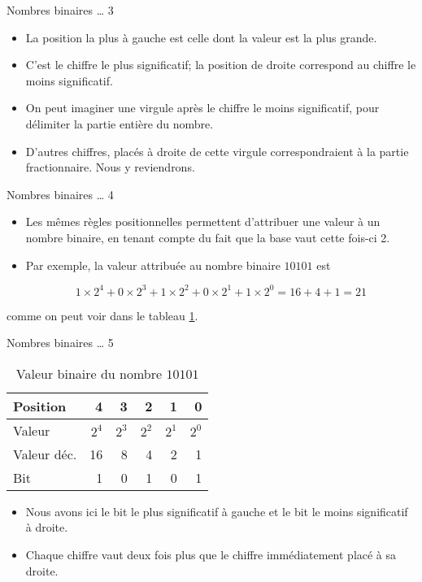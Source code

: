 \documentclass[presentation]{beamer}
\begin{document}
\begin{frame}[label={sec:org017026a}]{Nombres binaires \ldots{} 3}
\begin{itemize}
\item La position la plus à gauche est celle dont la valeur est la plus grande.

\item C'est le \alert{chiffre le plus significatif}; la position de droite correspond au \alert{chiffre le moins significatif}.

\item On peut imaginer une virgule après le chiffre le moins significatif, pour délimiter la partie entière du nombre.

\item D'autres chiffres, placés à droite de cette virgule correspondraient à la partie fractionnaire.  Nous y reviendrons.
\end{itemize}
\end{frame}

\begin{frame}[label={sec:orgdb9f49f}]{Nombres binaires \ldots{} 4}
\begin{itemize}
\item Les mêmes règles positionnelles permettent d'attribuer une valeur à un nombre binaire, en tenant compte du fait que la base vaut cette fois-ci 2.

\item Par exemple, la valeur attribuée au nombre binaire \(10101\) est

$$ 1 \times 2^4 + 0 \times 2^3 + 1 \times 2^2 + 0 \times 2^1 + 1 \times 2^0 = 16+4+1= 21 $$
\end{itemize}

comme on peut voir dans le tableau \ref{tab:org988c3da}.
\end{frame}

\begin{frame}[label={sec:orgf52df9d}]{Nombres binaires \ldots{} 5}
\begin{table}[htbp]
\caption{\label{tab:org988c3da}Valeur binaire du nombre \(10101\)}
\centering
\begin{tabular}{lrrrrr}
Position & 4 & 3 & 2 & 1 & 0\\[0pt]
\hline
Valeur & \(2^4\) & \(2^3\) & \(2^2\) & \(2^1\) & \(2^0\)\\[0pt]
Valeur déc. & 16 & 8 & 4 & 2 & 1\\[0pt]
Bit & 1 & 0 & 1 & 0 & 1\\[0pt]
\end{tabular}
\end{table}

\begin{itemize}
\item Nous avons ici le \alert{bit le plus significatif} à gauche et le \alert{bit le moins significatif} à droite.

\item Chaque chiffre vaut deux fois plus que le chiffre immédiatement placé à sa droite.
\end{itemize}
\end{frame}
\end{document}
